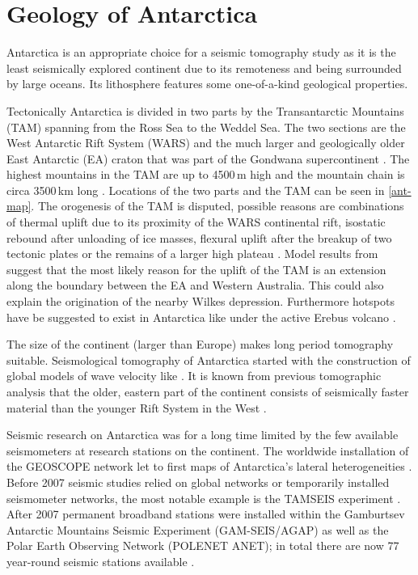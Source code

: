 \section{Geology of Antarctica}
Antarctica is an appropriate choice for a seismic tomography study as it is the least seismically explored continent 
due to its remoteness and being surrounded by large oceans. 
Its lithosphere features some one-of-a-kind geological properties. 

Tectonically Antarctica is divided in two parts by the Transantarctic Mountains (TAM) spanning from the Ross Sea to the Weddel Sea.
The two sections are the West Antarctic Rift System (WARS) and the much larger and geologically older East Antarctic (EA) craton that 
was part of the Gondwana supercontinent \citep{Gupta2009}. 
The highest mountains in the TAM are up to 4500$\,$m high and the mountain chain is circa 3500$\,$km long \citep{Morelli2004}.
Locations of the two parts and the TAM can be seen in \autoref{ant-map}.
The orogenesis %
of the TAM is disputed, possible reasons are combinations of thermal uplift due to its proximity of the WARS continental rift, 
isostatic rebound after unloading of ice masses, flexural uplift after the breakup of two tectonic plates or 
the remains of a larger high plateau \citep{VanWijk2008}.
Model results from \citealp{VanWijk2008} suggest that the most likely reason for the uplift of the TAM is an extension along the 
boundary between the EA and Western Australia. This could also explain the origination of the nearby Wilkes depression.
Furthermore hotspots have be suggested to exist in Antarctica like under the active Erebus volcano \citep{Gupta2009}.

The size of the continent (larger than Europe) makes long period tomography suitable.  
Seismological tomography of Antarctica started with the construction of global models of wave velocity like \citealp{Woodhouse1984}.
It is known from previous tomographic analysis that the older, eastern part of the continent consists of seismically faster material than 
the younger Rift System in the West \citep{Morelli2004}.

Seismic research on Antarctica was for a long time limited by the few available seismometers at research stations on the continent. 
The worldwide installation of the GEOSCOPE network let to first maps of Antarctica's lateral heterogeneities \citep{Roult1994}.
Before 2007 seismic studies relied on global networks or temporarily installed seismometer networks, the most notable
example is the TAMSEIS experiment \citep{Lawrence2006}. 
After 2007 permanent broadband stations were installed within the Gamburtsev Antarctic Mountains Seismic Experiment (GAM-SEIS/AGAP)
as well as the Polar Earth Observing Network (POLENET ANET); 
in total there are now 77 year-round seismic stations available \citep{Anthony2014}.  


